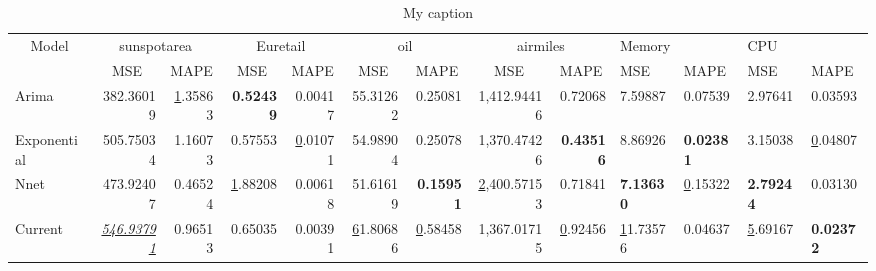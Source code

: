 \begin{table}[]
\centering
\caption{My caption}
\label{my-label}
\begin{tabular}{@{}|l|r|r|r|r|r|r|r|r|l|l|l|l|@{}}
\toprule
\multicolumn{1}{|c|}{\multirow{2}{*}{Model}} & \multicolumn{2}{c|}{sunspotarea}                                                & \multicolumn{2}{c|}{Euretail}                                        & \multicolumn{2}{c|}{oil}                                              & \multicolumn{2}{c|}{airmiles}                                            & \multicolumn{2}{l|}{Memory}         & \multicolumn{2}{l|}{CPU}            \\ \cmidrule(l){2-13} 
\multicolumn{1}{|c|}{}                       & \multicolumn{1}{c|}{MSE}                & \multicolumn{1}{c|}{MAPE}             & \multicolumn{1}{c|}{MSE}     & \multicolumn{1}{c|}{MAPE}             & \multicolumn{1}{c|}{MSE}               & \multicolumn{1}{c|}{MAPE}    & \multicolumn{1}{c|}{MSE}                  & \multicolumn{1}{c|}{MAPE}    & MSE              & MAPE             & MSE              & MAPE             \\ \midrule
Arima                                        & 382.36019                               & {\ul 1.35863}                         & \textbf{0.52439}             & 0.00417                               & 55.31262                               & 0.25081                      & 1,412.94416                               & 0.72068                      & 7.59887          & 0.07539          & 2.97641          & 0.03593          \\ \midrule
Exponential                                  & 505.75034                               & 1.16073                               & 0.57553                      & {\ul 0.01071}                         & 54.98904                               & 0.25078                      & 1,370.47426                               & \textbf{0.43516}             & 8.86926          & \textbf{0.02381} & 3.15038          & {\ul 0.04807}    \\ \midrule
Nnet                                         & 473.92407                               & 0.46524                               & {\ul 1.88208}                & 0.00618                               & 51.61619                               & \textbf{0.15951}             & {\ul 2,400.57153}                         & 0.71841                      & \textbf{7.13630} & {\ul 0.15322}    & \textbf{2.79244} & 0.03130          \\ \midrule
Current                                      & {\ul \textit{546.93791}}                & 0.96513                               & 0.65035                      & 0.00391                               & {\ul 61.80686}                         & {\ul 0.58458}                & 1,367.01715                               & {\ul 0.92456}                & {\ul 11.73576}   & 0.04637          & {\ul 5.69167}    & \textbf{0.02372} \\ \midrule

\end{tabular}
\end{table}
